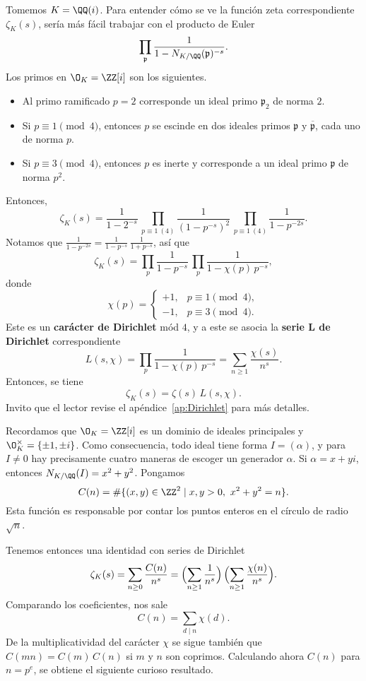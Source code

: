 Tomemos $K = \QQ (i)$. Para entender cómo se ve la función zeta correspondiente
$\zeta_K (s)$, sería más fácil trabajar con el producto de Euler
$$\prod_{\mathfrak{p}} \frac{1}{1 - N_{K/\QQ} (\mathfrak{p})^{-s}}.$$
Los primos en $\O_K = \ZZ[i]$ son los siguientes.
\begin{itemize}
\item Al primo ramificado $p = 2$ corresponde un ideal primo $\mathfrak{p}_2$
  de norma $2$.

\item Si $p \equiv 1 \pmod{4}$, entonces $p$ se escinde en dos ideales primos
  $\mathfrak{p}$ y $\overline{\mathfrak{p}}$, cada uno de norma $p$.

\item Si $p \equiv 3 \pmod{4}$, entonces $p$ es inerte y corresponde a un ideal
  primo $\mathfrak{p}$ de norma $p^2$.
\end{itemize}

Entonces,
\[ \zeta_K (s) =
   \frac{1}{1 - 2^{-s}} \,
   \prod_{p \equiv 1 ~ (4)} \frac{1}{(1 - p^{-s})^2} \,
   \prod_{p \equiv 1 ~ (4)} \frac{1}{1 - p^{-2s}}. \]
Notamos que $\frac{1}{1 - p^{-2s}} = \frac{1}{1 - p^{-s}}\,\frac{1}{1 + p^{-s}}$,
así que
$$\zeta_K (s) = \prod_p \frac{1}{1 - p^{-s}}\,\prod_p \frac{1}{1 - \chi(p)\,p^{-s}},$$
donde
\[ \chi(p) = \begin{cases}
  +1, & p \equiv 1 \pmod{4},\\
  -1, & p \equiv 3 \pmod{4}.
\end{cases} \]
Este es un \textbf{carácter de Dirichlet} mód $4$, y a este se asocia la
\textbf{serie L de Dirichlet} correspondiente
\[ L (s,\chi) = \prod_p \frac{1}{1 - \chi(p)\,p^{-s}} =
   \sum_{n\ge 1} \frac{\chi (s)}{n^s}. \]
Entonces, se tiene
$$\zeta_K (s) = \zeta (s) \, L (s,\chi).$$
Invito que el lector revise el apéndice~\ref{ap:Dirichlet} para más detalles.

Recordamos que $\O_K = \ZZ [i]$ es un dominio de ideales principales y
$\O_K^\times = \{ \pm 1, \pm i \}$. Como consecuencia, todo ideal tiene forma
$I = (\alpha)$, y para $I \ne 0$ hay precisamente cuatro maneras de escoger un
generador $\alpha$. Si $\alpha = x + yi$, entonces $N_{K/\QQ} (I) = x^2 + y^2$.
Pongamos
$$C (n) = \# \{ (x,y) \in \ZZ^2 \mid x,y > 0, ~ x^2 + y^2 = n \}.$$
Esta función es responsable por contar los puntos enteros en el círculo de radio
$\sqrt{n}$.

Tenemos entonces una identidad con series de Dirichlet
\[ \zeta_K (s) = \sum_{n\ge 0} \frac{C (n)}{n^s} =
\Bigl(\sum_{n\ge 1} \frac{1}{n^s}\Bigr)\,\Bigl(\sum_{n\ge 1} \frac{\chi (n)}{n^s}\Bigr). \]
Comparando los coeficientes, nos sale
$$C (n) = \sum_{d \mid n} \chi (d).$$
De la multiplicatividad del carácter $\chi$ se sigue también que
$C (mn) = C (m)\,C (n)$ si $m$ y $n$ son coprimos. Calculando ahora $C (n)$ para
$n = p^e$, se obtiene el siguiente curioso resultado.

